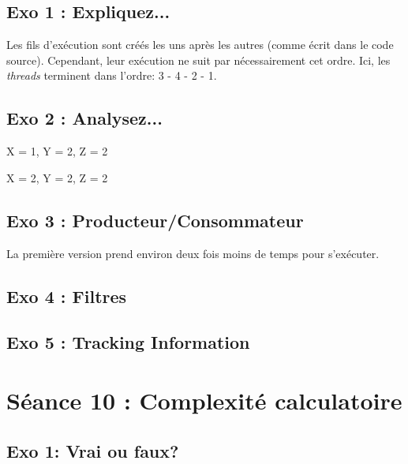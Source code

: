 \subsection{Exo 1 : Expliquez...}


Les fils d'exécution sont créés les uns après les autres (comme écrit dans le code source). Cependant, leur exécution ne suit par nécessairement cet ordre.
Ici, les \textit{threads} terminent dans l'ordre: 3 - 4 - 2 - 1. 


\subsection{Exo 2 : Analysez...}

X = 1, Y = 2, Z = 2

X = 2, Y = 2, Z = 2

\subsection{Exo 3 : Producteur/Consommateur}

La première version prend environ deux fois moins de temps pour s'exécuter.


\subsection{Exo 4 : Filtres}



\subsection{Exo 5 : Tracking Information}




\newpage
\section{Séance 10 : Complexité calculatoire}
\subsection{Exo 1: Vrai ou faux?}




















